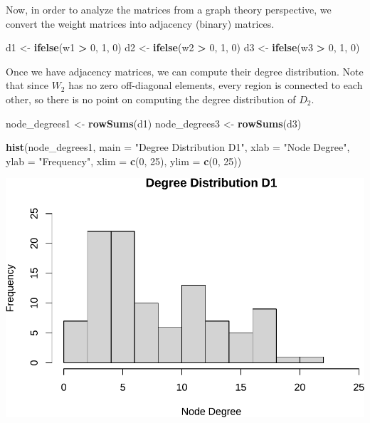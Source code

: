 \documentclass[
  a4paper,
]{article}
\newenvironment{Shaded}{\begin{snugshade}}{\end{snugshade}}
\newcommand{\AttributeTok}[1]{\textcolor[rgb]{0.13,0.29,0.53}{#1}}
\newcommand{\DecValTok}[1]{\textcolor[rgb]{0.00,0.00,0.81}{#1}}
\newcommand{\FunctionTok}[1]{\textcolor[rgb]{0.13,0.29,0.53}{\textbf{#1}}}
\newcommand{\NormalTok}[1]{#1}
\newcommand{\OtherTok}[1]{\textcolor[rgb]{0.56,0.35,0.01}{#1}}
\newcommand{\SpecialCharTok}[1]{\textcolor[rgb]{0.81,0.36,0.00}{\textbf{#1}}}
\newcommand{\StringTok}[1]{\textcolor[rgb]{0.31,0.60,0.02}{#1}}
\begin{document}
Now, in order to analyze the matrices from a graph theory perspective,
we convert the weight matrices into adjacency (binary) matrices.

\begin{Shaded}
\begin{Highlighting}[]
\NormalTok{d1 }\OtherTok{\textless{}{-}} \FunctionTok{ifelse}\NormalTok{(w1 }\SpecialCharTok{\textgreater{}} \DecValTok{0}\NormalTok{, }\DecValTok{1}\NormalTok{, }\DecValTok{0}\NormalTok{)}
\NormalTok{d2 }\OtherTok{\textless{}{-}} \FunctionTok{ifelse}\NormalTok{(w2 }\SpecialCharTok{\textgreater{}} \DecValTok{0}\NormalTok{, }\DecValTok{1}\NormalTok{, }\DecValTok{0}\NormalTok{)}
\NormalTok{d3 }\OtherTok{\textless{}{-}} \FunctionTok{ifelse}\NormalTok{(w3 }\SpecialCharTok{\textgreater{}} \DecValTok{0}\NormalTok{, }\DecValTok{1}\NormalTok{, }\DecValTok{0}\NormalTok{)}
\end{Highlighting}
\end{Shaded}

Once we have adjacency matrices, we can compute their degree
distribution. Note that since \(W_2\) has no zero off-diagonal elements,
every region is connected to each other, so there is no point on
computing the degree distribution of \(D_2\).

\begin{Shaded}
\begin{Highlighting}[]
\NormalTok{node\_degrees1 }\OtherTok{\textless{}{-}} \FunctionTok{rowSums}\NormalTok{(d1)}
\NormalTok{node\_degrees3 }\OtherTok{\textless{}{-}} \FunctionTok{rowSums}\NormalTok{(d3)}

\FunctionTok{hist}\NormalTok{(node\_degrees1, }\AttributeTok{main =} \StringTok{"Degree Distribution D1"}\NormalTok{, }\AttributeTok{xlab =} \StringTok{"Node Degree"}\NormalTok{, }\AttributeTok{ylab =} \StringTok{"Frequency"}\NormalTok{,}
    \AttributeTok{xlim =} \FunctionTok{c}\NormalTok{(}\DecValTok{0}\NormalTok{, }\DecValTok{25}\NormalTok{), }\AttributeTok{ylim =} \FunctionTok{c}\NormalTok{(}\DecValTok{0}\NormalTok{, }\DecValTok{25}\NormalTok{))}
\end{Highlighting}
\end{Shaded}

\includegraphics{assignment2_files/figure-latex/unnamed-chunk-9-1.pdf}
\end{document}
